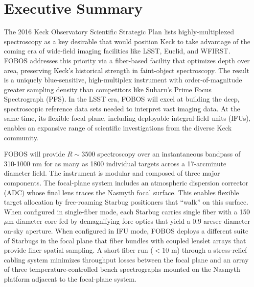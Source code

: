
\section*{Executive Summary}


The 2016 Keck Observatory Scientific Strategic Plan lists
highly-multiplexed spectroscopy as a key desirable that would
position Keck to take advantage of the coming era of wide-field
imaging facilities like LSST, Euclid, and WFIRST.
FOBOS
addresses this priority via a fiber-based facility that optimizes
depth over area, preserving Keck's historical strength in
faint-object spectroscopy. The result is a uniquely blue-sensitive,
high-multiplex instrument with order-of-magnitude greater sampling
density than competitors like Subaru's Prime Focus Spectrograph
(PFS). In the LSST era, FOBOS will excel at building the deep,
spectroscopic reference data sets needed to interpret vast imaging
data. At the same time, its flexible focal plane, including
deployable integral-field units (IFUs), enables an expansive range of
scientific investigations from the diverse Keck community.

FOBOS will provide $R \sim 3500$ spectroscopy over an instantaneous
bandpass of 310-1000 nm for as many as 1800 individual targets across
a 17-arcminute diameter field. The instrument is modular and composed
of three major components. The focal-plane system includes an
atmospheric dispersion corrector (ADC) whose final lens traces the
Nasmyth focal surface. This enables flexible target allocation by
free-roaming Starbug positioners that ``walk'' on this surface. When
configured in single-fiber mode, each Starbug carries single fiber
with a 150 $\mu$m diameter core fed by demagnifying fore-optics that
yield a 0.9-arcsec diameter on-sky aperture. When configured in IFU
mode, FOBOS deploys a different suite of Starbugs in the focal plane
that fiber bundles with coupled lenslet arrays that provide finer
spatial sampling. A short fiber run ($<$10 m) through a stress-relief
cabling system minimizes throughput losses between the focal plane
and an array of three temperature-controlled bench spectrographs
mounted on the Nasmyth platform adjacent to the focal-plane system.


